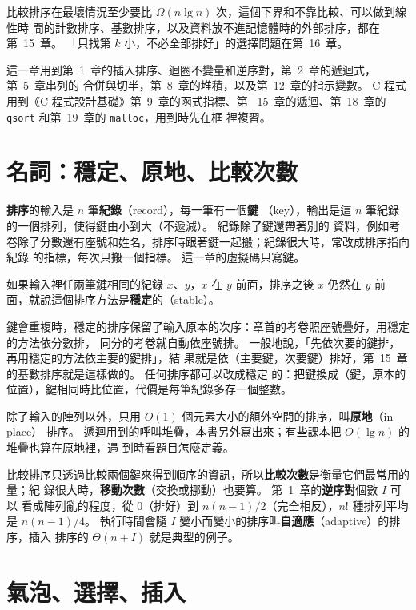 比較排序在最壞情況至少要比 $\Omega(n \lg n)$ 次，這個下界和不靠比較、可以做到線性時
間的計數排序、基數排序，以及資料放不進記憶體時的外部排序，都在第~15~章。 「只找第
$k$ 小，不必全部排好」的選擇問題在第~16~章。

這一章用到第~1~章的插入排序、迴圈不變量和逆序對，第~2~章的遞迴式，第~5~章串列的
合併與切半，第~8~章的堆積，以及第~12~章的指示變數。 C 程式用到《C 程式設計基礎》第~9~章的函式指標、第
~15~章的遞迴、第~18~章的 \texttt{qsort} 和第~19~章的 \texttt{malloc}，用到時先在框
裡複習。

\section{名詞：穩定、原地、比較次數}
\label{sec:so-terms}

\textbf{排序}的輸入是 $n$ 筆\textbf{紀錄}（record），每一筆有一個\textbf{鍵}
（key），輸出是這 $n$ 筆紀錄的一個排列，使得鍵由小到大（不遞減）。 紀錄除了鍵還帶著別的
資料，例如考卷除了分數還有座號和姓名，排序時跟著鍵一起搬；紀錄很大時，常改成排序指向紀錄
的指標，每次只搬一個指標。 這一章的虛擬碼只寫鍵。

\begin{definition}[穩定的排序]
\label{def:so-stable}
如果輸入裡任兩筆鍵相同的紀錄 $x$、$y$，$x$ 在 $y$ 前面，排序之後 $x$ 仍然在 $y$ 前
面，就說這個排序方法是\textbf{穩定}的（stable）。
\end{definition}

鍵會重複時，穩定的排序保留了輸入原本的次序：章首的考卷照座號疊好，用穩定的方法依分數排，
同分的考卷就自動依座號排。 一般地說，「先依次要的鍵排，再用穩定的方法依主要的鍵排」，結
果就是依（主要鍵，次要鍵）排好，第~15~章的基數排序就是這樣做的。 任何排序都可以改成穩定
的：把鍵換成（鍵，原本的位置），鍵相同時比位置，代價是每筆紀錄多存一個整數。

除了輸入的陣列以外，只用 $O(1)$ 個元素大小的額外空間的排序，叫\textbf{原地}（in place）
排序。 遞迴用到的呼叫堆疊，本書另外寫出來；有些課本把 $O(\lg n)$ 的堆疊也算在原地裡，遇
到時看題目怎麼定義。

比較排序只透過比較兩個鍵來得到順序的資訊，所以\textbf{比較次數}是衡量它們最常用的量；紀
錄很大時，\textbf{移動次數}（交換或挪動）也要算。 第~1~章的\textbf{逆序對}個數 $I$ 可以
看成陣列亂的程度，從 $0$（排好）到 $n(n-1)/2$（完全相反），$n!$ 種排列平均是
$n(n-1)/4$。 執行時間會隨 $I$ 變小而變小的排序叫\textbf{自適應}（adaptive）的排序，插入
排序的 $\Theta(n + I)$ 就是典型的例子。

\section{氣泡、選擇、插入}
\label{sec:so-simple}


